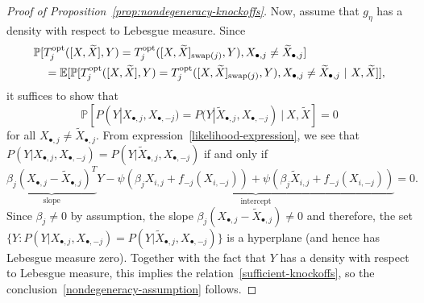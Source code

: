 \documentclass[ejs]{imsart}
\numberwithin{equation}{section}
\theoremstyle{plain}
\theoremstyle{definition}
\theoremstyle{remark}
\newcommand{\srx}{X}
\newcommand{\srxk}{\widetilde X}
\newcommand{\sry}{Y}
\begin{document}
\begin{proof}[Proof of Proposition~\ref{prop:nondegeneracy-knockoffs}]
	Now, assume that $g_\eta$ has a density with respect to Lebesgue measure. Since
	\begin{equation*}
	\begin{split}
	&\mathbb P[T^{\textnormal{opt}}_j([\srx, \srxk], \sry) = T^{\textnormal{opt}}_j([\srx, \srxk]_{\textnormal{swap}(j)}, \sry), \srx_{\bullet,j} \neq \srxk_{\bullet,j}] \\
	&\quad= \mathbb E[\mathbb P[T^{\textnormal{opt}}_j([\srx, \srxk], \sry) = T^{\textnormal{opt}}_j([\srx, \srxk]_{\textnormal{swap}(j)}, \sry), \srx_{\bullet,j} \neq \srxk_{\bullet,j}\ |\ \srx, \srxk]],
	\end{split}
	\end{equation*}
	it suffices to show that
	\begin{equation}
	\mathbb P[P(\sry|\srx_{\bullet,j}, \srx_{\bullet,-j}) = P(\sry|\srxk_{\bullet,j}, \srx_{\bullet,-j})\ |\ \srx, \srxk] = 0
	\label{sufficient-knockoffs}
	\end{equation}
	for all $\srx_{\bullet,j} \neq \srxk_{\bullet,j}$. From expression~\eqref{likelihood-expression}, we see that $P(\sry|\srx_{\bullet,j}, \srx_{\bullet,-j}) = P(\sry|\srxk_{\bullet,j}, \srx_{\bullet,-j})$ if and only if
	\begin{equation*}
	\underbrace{\beta_j (\srx_{\bullet,j} - \srxk_{\bullet,j})^T}_{\text{slope}} \sry - \underbrace{\psi(\beta_j \srx_{i,j} + f_{-j}(\srx_{i,-j})) + \psi(\beta_j \srxk_{i,j} + f_{-j}(\srx_{i,-j}))}_{\text{intercept}} = 0.
	\end{equation*}
	Since $\beta_j \neq 0$ by assumption, the slope $\beta_j (\srx_{\bullet,j} - \srxk_{\bullet,j}) \neq 0$ and therefore, the set $\{\sry: P(\sry|\srx_{\bullet,j}, \srx_{\bullet,-j}) = P(\sry|\srxk_{\bullet,j}, \srx_{\bullet,-j})\}$ is a hyperplane (and hence has Lebesgue measure zero). Together with the fact that $\sry$ has a density with respect to Lebesgue measure, this implies the relation~\eqref{sufficient-knockoffs}, so the conclusion~\eqref{nondegeneracy-assumption} follows. 
\end{proof}
\end{document}
